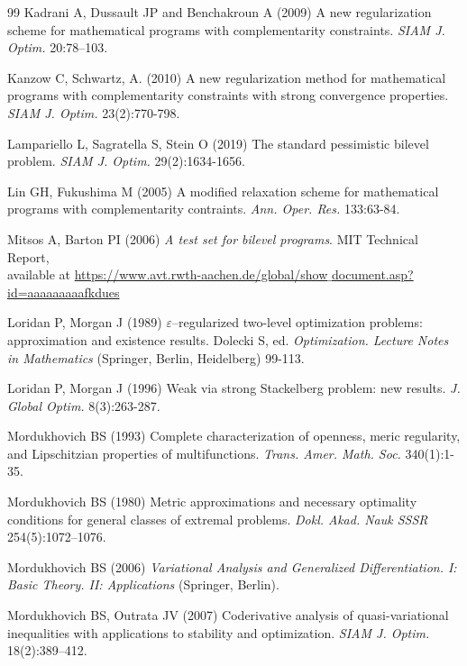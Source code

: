 \begin{thebibliography}{99}
 Kadrani A, Dussault JP and Benchakroun A (2009) A new
regularization scheme for mathematical programs with complementarity
constraints. \emph{SIAM J. Optim.} 20:78--103.


 Kanzow C, Schwartz, A. (2010) A new regularization method for
mathematical programs with complementarity constraints with strong
convergence properties. \textit{SIAM J. Optim.} 23(2):770-798.

 Lampariello L, Sagratella S, Stein  O (2019)  The standard pessimistic bilevel problem.
\emph{SIAM J. Optim.} 29(2):1634-1656.
	
	 Lin GH, Fukushima M (2005) A modified relaxation scheme for
	mathematical programs with complementarity contraints. \emph{Ann. Oper. Res.} 133:63-84.
	
	 Mitsos A, Barton PI (2006) \textit{A test set for bilevel programs}. MIT  Technical Report,\\
    available at 
    \href{https://www.avt.rwth-aachen.de/global/show_document.asp?id=aaaaaaaaafkdues}{https://www.avt.rwth-aachen.de/global/show$\_$document.asp?id=aaaaaaaaafkdues}
	
Loridan  P, Morgan J (1989)  $\varepsilon$--regularized two-level optimization problems: approximation and existence results. Dolecki S, ed.\emph{ Optimization. Lecture Notes in Mathematics} (Springer, Berlin, Heidelberg) 99-113.
	
	 Loridan  P, Morgan J (1996)  Weak via strong Stackelberg problem: new results. \emph{J. Global Optim.} 8(3):263-287.

	
Mordukhovich BS (1993) Complete characterization of openness,
	meric regularity, and Lipschitzian properties of multifunctions. \emph{Trans. Amer. Math. Soc.} 340(1):1-35.

	 Mordukhovich BS (1980) Metric approximations and necessary
	optimality conditions for general classes of extremal problems. \emph{Dokl. Akad. Nauk SSSR} 254(5):1072–1076.
		
	Mordukhovich BS (2006) \emph{Variational Analysis and Generalized
	 Differentiation. I: Basic Theory. II: Applications} (Springer, Berlin).
	
	 Mordukhovich BS, Outrata JV (2007)   Coderivative analysis of quasi-variational inequalities with applications to stability and optimization. \emph{SIAM J. Optim.} 18(2):389--412.
	

\end{thebibliography}
